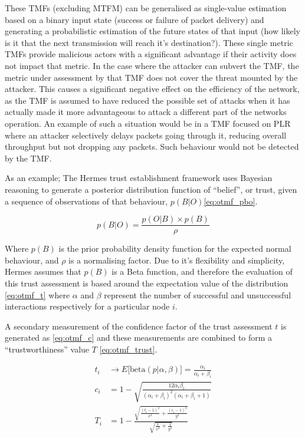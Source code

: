 \documentclass{aamas2016}
\begin{document}
These TMFs (excluding MTFM) can be generalised as single-value estimation based on a binary input state (success or failure of packet delivery) and generating a probabilistic estimation of the future states of that input (how likely is it that the next transmission will reach it's destination?). 
These single metric TMFs provide malicious actors with a significant advantage if their activity does not impact that metric.
In the case where the attacker can subvert the TMF, the metric under assessment by that TMF does not cover the threat mounted by the attacker. 
This causes a significant negative effect on the efficiency of the network, as the TMF is assumed to have reduced the possible set of attacks when it has actually made it more advantageous to attack a different part of the networks operation.
An example of such a situation would be in a TMF focused on PLR where an attacker selectively delays packets going through it, reducing overall throughput but not dropping any packets. Such behaviour would not be detected by the TMF.

As an example; The Hermes trust establishment framework \cite{Zouridaki2005} uses Bayesian reasoning to generate a posterior distribution function of ``belief'', or trust, given a sequence of observations of that behaviour, $p(B|O)$\eqref{eq:otmf_pbo}.

\begin{equation}
p(B|O)  = \frac{p(O|B) \times p(B)}{\rho}
\label{eq:otmf_pbo}
\end{equation}

Where $p(B)$ is the prior probability density function for the expected normal behaviour, and $\rho$ is a normalising factor.
Due to it's flexibility and simplicity, Hermes assumes that $p(B)$ is a Beta function, and therefore the evaluation of this trust assessment is based around the expectation value of the distribution \eqref{eq:otmf_t}  where $\alpha$ and $\beta$ represent the number of successful and unsuccessful interactions respectively for a particular node $i$.

A secondary measurement of the confidence factor of the trust assessment $t$ is generated as \eqref{eq:otmf_c} and these measurements are combined to form a ``trustworthiness'' value $T$ \eqref{eq:otmf_trust}.

\begin{align}
t_i &\to E\lbrack\text{beta}(p|\alpha,\beta)\rbrack = \frac{\alpha_i}{\alpha_i+\beta_i} \label{eq:otmf_t}\\[5pt]
c_i &= 1 - \sqrt{\frac{12\alpha_i\beta_i}{(\alpha_i+\beta_i)^2(\alpha_i+\beta_i+1)}} \label{eq:otmf_c}\\[5pt]
T_i &= 1 - \frac{\sqrt{\frac{(t_i-1)^2}{x^2} + \frac{(c_i-1)^2}{y^2}}}{\sqrt{\frac{1}{x^2}+\frac{1}{y^2}}} \label{eq:otmf_trust}
\end{align}
\end{document}
